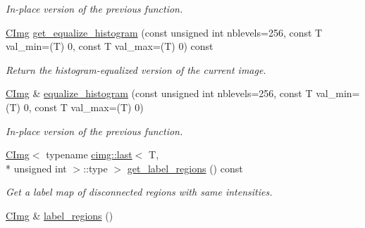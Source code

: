 \begin{DoxyCompactItemize}
\begin{DoxyCompactList}\small\item\em In-\/place version of the previous function. \end{DoxyCompactList}\item 
\hyperlink{structcimg__library_1_1_c_img}{C\-Img} \hyperlink{structcimg__library_1_1_c_img_ad51813f525845badc730fafa4282f94a}{get\-\_\-equalize\-\_\-histogram} (const unsigned int nblevels=256, const T val\-\_\-min=(T) 0, const T val\-\_\-max=(T) 0) const 
\begin{DoxyCompactList}\small\item\em Return the histogram-\/equalized version of the current image. \end{DoxyCompactList}\item 
\hypertarget{structcimg__library_1_1_c_img_a386c5bfabae28bf303b5aba88e73b974}{\hyperlink{structcimg__library_1_1_c_img}{C\-Img} \& \hyperlink{structcimg__library_1_1_c_img_a386c5bfabae28bf303b5aba88e73b974}{equalize\-\_\-histogram} (const unsigned int nblevels=256, const T val\-\_\-min=(T) 0, const T val\-\_\-max=(T) 0)}\label{structcimg__library_1_1_c_img_a386c5bfabae28bf303b5aba88e73b974}

\begin{DoxyCompactList}\small\item\em In-\/place version of the previous function. \end{DoxyCompactList}\item 
\hypertarget{structcimg__library_1_1_c_img_a9e6fae555e0e868420b11c2cb9060697}{\hyperlink{structcimg__library_1_1_c_img}{C\-Img}$<$ typename \hyperlink{structcimg__library_1_1cimg_1_1last}{cimg\-::last}$<$ T, \\*
unsigned int $>$\-::type $>$ \hyperlink{structcimg__library_1_1_c_img_a9e6fae555e0e868420b11c2cb9060697}{get\-\_\-label\-\_\-regions} () const }\label{structcimg__library_1_1_c_img_a9e6fae555e0e868420b11c2cb9060697}

\begin{DoxyCompactList}\small\item\em Get a label map of disconnected regions with same intensities. \end{DoxyCompactList}\item 
\hypertarget{structcimg__library_1_1_c_img_a6917402268ffbfc6efcfbb44e86e82b1}{\hyperlink{structcimg__library_1_1_c_img}{C\-Img} \& \hyperlink{structcimg__library_1_1_c_img_a6917402268ffbfc6efcfbb44e86e82b1}{label\-\_\-regions} ()}\label{structcimg__library_1_1_c_img_a6917402268ffbfc6efcfbb44e86e82b1}


\end{DoxyCompactItemize}
